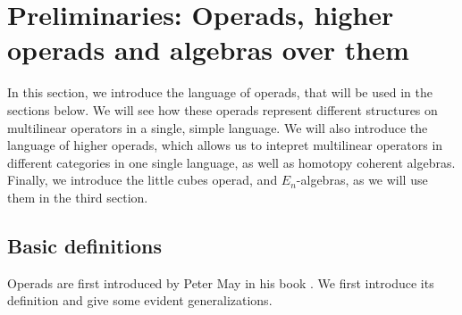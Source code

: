\documentclass[twoside]{article}
\begin{document}
\section{Preliminaries: Operads, higher operads and algebras over them}

In this section, we introduce the language of operads, that will be used in
the sections below. We will see how these operads represent different
structures on multilinear operators in a single, simple language.
We will also introduce the language of higher operads, which allows us to
intepret multilinear operators in different categories in one
single language, as well as homotopy coherent algebras. Finally, we introduce 
the little cubes operad, and $E_n$-algebras, as we will use them
in the third section.

\subsection{Basic definitions}

Operads are first introduced by Peter May in his book \cite{May72}. 
We first introduce its definition and give some evident generalizations.
\end{document}
